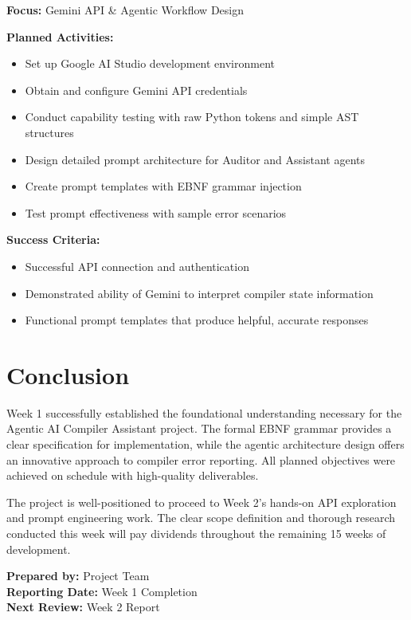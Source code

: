 \documentclass[a4paper,11pt]{article}
\begin{document}
\textbf{Focus:} Gemini API \& Agentic Workflow Design

\textbf{Planned Activities:}
\begin{itemize}[leftmargin=*]
    \item Set up Google AI Studio development environment
    \item Obtain and configure Gemini API credentials
    \item Conduct capability testing with raw Python tokens and simple AST structures
    \item Design detailed prompt architecture for Auditor and Assistant agents
    \item Create prompt templates with EBNF grammar injection
    \item Test prompt effectiveness with sample error scenarios
\end{itemize}

\textbf{Success Criteria:}
\begin{itemize}[leftmargin=*]
    \item Successful API connection and authentication
    \item Demonstrated ability of Gemini to interpret compiler state information
    \item Functional prompt templates that produce helpful, accurate responses
\end{itemize}

\section{Conclusion}

Week 1 successfully established the foundational understanding necessary for the Agentic AI Compiler Assistant project. The formal EBNF grammar provides a clear specification for implementation, while the agentic architecture design offers an innovative approach to compiler error reporting. All planned objectives were achieved on schedule with high-quality deliverables.

The project is well-positioned to proceed to Week 2's hands-on API exploration and prompt engineering work. The clear scope definition and thorough research conducted this week will pay dividends throughout the remaining 15 weeks of development.

\vspace{5mm}
\noindent\textbf{Prepared by:} Project Team \\
\textbf{Reporting Date:} Week 1 Completion \\
\textbf{Next Review:} Week 2 Report
\end{document}

